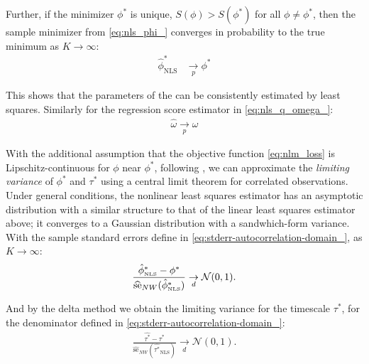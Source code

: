\documentclass[main.tex]{subfiles}
\begin{document}
\noindent Further, if the minimizer $\phi^*$ is unique, $S(\phi) > S(\phi^*)$ for all $\phi \ne \phi^*$, then the sample minimizer from \eqref{eq:nls_phi_} converges in probability to the true minimum as $K\to\infty$:
\begin{align}
\hat \phi^*_{\scriptscriptstyle\text{NLS}} &\underset{p}{\to} \phi^*
\end{align}

\noindent This shows that the parameters of the  can be consistently estimated by least squares. Similarly for the regression score estimator in \eqref{eq:nls_q_omega_}:
\begin{align}
\hat \omega \underset{p}{\to} \omega
\end{align}


With the additional assumption that the objective function \eqref{eq:nlm_loss} is Lipschitz-continuous for $\phi$ near $\phi^*$, following \citet[Theorem~23.2]{hansen_econometrics_2022}, we can approximate the \textit{limiting variance} of $\phi^*$ and $\tau^*$ using a central limit theorem for correlated observations. Under general conditions, the nonlinear least squares estimator has an asymptotic distribution with a similar structure to that of the linear least squares estimator above; it converges to a Gaussian distribution with a sandwhich-form variance. With the sample standard errors define in \eqref{eq:stderr-autocorrelation-domain_}, as $K\to\infty$:
\begin{align}
\frac{\hat\phi^*_{\scriptscriptstyle\scriptscriptstyle\text{NLS}} - \phi^*}{\widehat{\text{se}}_{NW}(\hat\phi^*_{\scriptscriptstyle\text{NLS}})} \underset{d}{\to} \mathcal{N}(0, 1). \label{eq:nls-phi-clt}
\end{align}

\noindent And by the delta method we obtain the limiting variance for the timescale $\tau^*$, for the denominator defined in \eqref{eq:stderr-autocorrelation-domain_}:
\begin{align}
\frac{\hat{\tau^*} - \tau^*}{\widehat{\text{se}}_{NW}(\hat{\tau^*}_{\scriptscriptstyle\text{NLS}})} \underset{d}{\to} \mathcal{N}(0,1).
\end{align}
\end{document}
